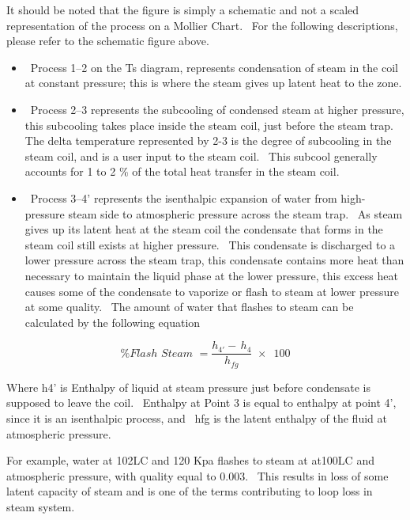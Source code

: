 It should be noted that the figure is simply a schematic and not a scaled representation of the process on a Mollier Chart.~ For the following descriptions, please refer to the schematic figure above.

\begin{itemize}
\item
  ~Process 1--2 on the Ts diagram, represents condensation of steam in the coil at constant pressure; this is where the steam gives up latent heat to the zone.
\item
  ~Process 2--3 represents the subcooling of condensed steam at higher pressure, this subcooling takes place inside the steam coil, just before the steam trap.~ The delta temperature represented by 2-3 is the degree of subcooling in the steam coil, and is a user input to the steam coil.~ This subcool generally accounts for 1 to 2 \% of the total heat transfer in the steam coil.
\item
  ~Process 3--4' represents the isenthalpic expansion of water from high-pressure steam side to atmospheric pressure across the steam trap.~ As steam gives up its latent heat at the steam coil the condensate that forms in the steam coil still exists at higher pressure.~ This condensate is discharged to a lower pressure across the steam trap, this condensate contains more heat than necessary to maintain the liquid phase at the lower pressure, this excess heat causes some of the condensate to vaporize or flash to steam at lower pressure at some quality.~ The amount of water that flashes to steam can be calculated by the following equation
\end{itemize}

\begin{equation}
\% Flash\,\,Steam\,\, = \frac{{{h_{4'}} - \,{h_4}}}{{{h_{fg}}}}\,\, \times \,\,\,100
\end{equation}

Where h4' is Enthalpy of liquid at steam pressure just before condensate is supposed to leave the coil.~ Enthalpy at Point 3 is equal to enthalpy at point 4', since it is an isenthalpic process, and~ hfg is the latent enthalpy of the fluid at atmospheric pressure.

For example, water at 102LC and 120 Kpa flashes to steam at at100LC and atmospheric pressure, with quality equal to 0.003.~ This results in loss of some latent capacity of steam and is one of the terms contributing to loop loss in steam system.

